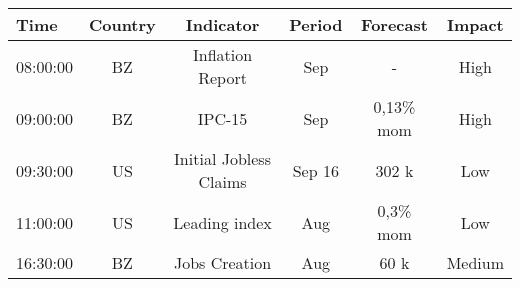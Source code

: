 \documentclass[article,crop=false]{standalone}%
\begin{document}
%
\normalsize%
\setlength{\tabcolsep}{0.15cm}%
\begin{tabular}[h]{l | c c c c c}%
\hline%
\rowcolor{white}%
\textbf{Time}&\textbf{Country}&\textbf{Indicator}&\textbf{Period}&\textbf{Forecast}&\textbf{Impact}\\%
\hline%
\rowcolor{lightgray}%
08:00:00&BZ&Inflation Report&Sep&{-}&High\\%
\rowcolor{white}%
09:00:00&BZ&IPC{-}15&Sep&0,13\% mom&High\\%
\rowcolor{lightgray}%
09:30:00&US&Initial Jobless Claims&Sep 16&302 k&Low\\%
\rowcolor{white}%
11:00:00&US&Leading index&Aug&0,3\% mom&Low\\%
\rowcolor{lightgray}%
16:30:00&BZ&Jobs Creation&Aug&60 k&Medium\\%
\hline%
\end{tabular}%
\end{document}

